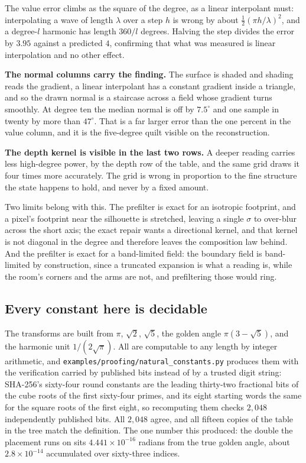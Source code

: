 The value error climbs as the square of the degree, as a linear interpolant must: interpolating a wave of length \(\lambda\) over a step \(h\) is wrong by about \(\tfrac12(\pi h/\lambda)^2\), and a degree-\(l\) harmonic has length \(360/l\) degrees. Halving the step divides the error by \(3.95\) against a predicted \(4\), confirming that what was measured is linear interpolation and no other effect.

\textbf{The normal columns carry the finding.} The surface is shaded and shading reads the gradient, a linear interpolant has a constant gradient inside a triangle, and so the drawn normal is a staircase across a field whose gradient turns smoothly. At degree ten the median normal is off by \(7.5^\circ\) and one sample in twenty by more than \(47^\circ\). That is a far larger error than the one percent in the value column, and it is the five-degree quilt visible on the reconstruction.

\textbf{The depth kernel is visible in the last two rows.} A deeper reading carries less high-degree power, by the depth row of the table, and the same grid draws it four times more accurately. The grid is wrong in proportion to the fine structure the state happens to hold, and never by a fixed amount.

Two limits belong with this. The prefilter is exact for an isotropic footprint, and a pixel's footprint near the silhouette is stretched, leaving a single \(\sigma\) to over-blur across the short axis; the exact repair wants a directional kernel, and that kernel is not diagonal in the degree and therefore leaves the composition law behind. And the prefilter is exact for a band-limited field: the boundary field is band-limited by construction, since a truncated expansion is what a reading is, while the room's corners and the arms are not, and prefiltering those would ring.

\subsection{Every constant here is decidable}

The transforms are built from \(\pi\), \(\sqrt2\), \(\sqrt5\), the golden angle \(\pi(3-\sqrt5)\), and the harmonic unit \(1/(2\sqrt\pi)\). All are computable to any length by integer arithmetic, and \texttt{examples/proofing/natural\_constants.py} produces them with the verification carried by published bits instead of by a trusted digit string: SHA-256's sixty-four round constants are the leading thirty-two fractional bits of the cube roots of the first sixty-four primes, and its eight starting words the same for the square roots of the first eight, so recomputing them checks \(2{,}048\) independently published bits. All \(2{,}048\) agree, and all fifteen copies of the table in the tree match the definition. The one number this produced: the double the placement runs on sits \(4.441 \times 10^{-16}\) radians from the true golden angle, about \(2.8 \times 10^{-14}\) accumulated over sixty-three indices.

